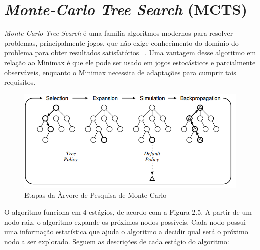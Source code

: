 


\section{\label{sec:secao5}\textit{Monte-Carlo Tree Search} (MCTS)}

\textit{Monte-Carlo Tree Search} é uma família algoritmos modernos para resolver problemas, principalmente jogos, que não exige conhecimento do domínio do problema para obter resultados satisfatórios ~\cite{MONTECARLOSURVEY}. Uma vantagem desse algoritmo em relação ao Minimax é que ele pode ser usado em jogos estocásticos e parcialmente observáveis, enquanto o Minimax necessita de adaptações para cumprir tais requisitos. 

    \begin{figure}[H]
      \centering
      \includegraphics[width=1\textwidth]{EieiQ.png}
      \caption{Etapas da Àrvore de Pesquisa de Monte-Carlo}
    \end{figure}


O algoritmo funciona em 4 estágios, de acordo com a Figura 2.5. A partir de um nodo raiz, o algoritmo expande os próximos nodos possíveis. Cada nodo possui uma informação estatística que ajuda o algoritmo a decidir qual será o próximo nodo a ser explorado. Seguem as descrições de cada estágio do algoritmo:

